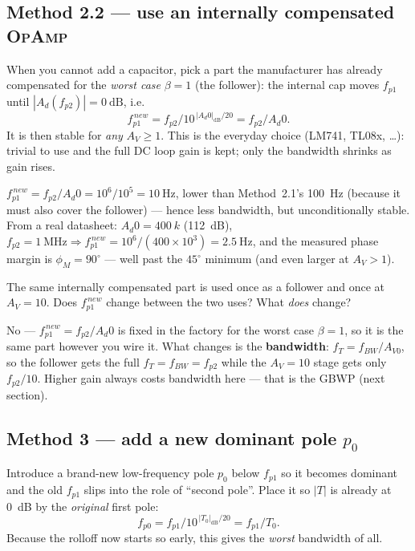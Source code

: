 \documentclass[11pt,a4paper,oneside]{book}
\newcommand{\Ad}{A_d}
\newcommand{\op}{\textsc{OpAmp}}
\begin{document}
\subsection{Method 2.2 --- use an internally compensated \op{}}
When you cannot add a capacitor, pick a part the manufacturer has already
compensated for the \emph{worst case} $\beta=1$ (the follower): the internal cap
moves $f_{p1}$ until $|\Ad(f_{p2})|=\qty{0}{\dB}$, i.e.
\[
  f_{p1}^{\,new}=f_{p2}\big/10^{\,|\Ad0|_{\mathrm{dB}}/20}=f_{p2}/\Ad0 .
\]
It is then stable for \emph{any} $A_V\ge1$. This is the everyday choice
(LM741, TL08x, \dots): trivial to use and the full DC loop gain is kept; only the
bandwidth shrinks as gain rises.

\begin{wexample}
$f_{p1}^{\,new}=f_{p2}/\Ad0=10^{6}/10^{5}=\qty{10}{\hertz}$, lower than
Method~2.1's \qty{100}{\hertz} (because it must also cover the follower) --- hence
less bandwidth, but unconditionally stable. From a real datasheet:
$\Ad0=\qty{400}{k}$ (\qty{112}{\dB}), $f_{p2}=\qty{1}{\mega\hertz}\Rightarrow
f_{p1}^{\,new}=10^{6}/(400\times10^{3})=\qty{2.5}{\hertz}$, and the measured phase
margin is $\phi_M=90^\circ$ --- well past the $45^\circ$ minimum (and even larger
at $A_V>1$).
\end{wexample}

\begin{exercise}
The same internally compensated part is used once as a follower and once at
$A_V=10$. Does $f_{p1}^{\,new}$ change between the two uses? What \emph{does}
change?
\end{exercise}
\begin{solution}
No --- $f_{p1}^{\,new}=f_{p2}/\Ad0$ is fixed in the factory for the worst case
$\beta=1$, so it is the same part however you wire it. What changes is the
\textbf{bandwidth}: $f_T=f_{BW}/A_{V0}$, so the follower gets the full
$f_T=f_{BW}=f_{p2}$ while the $A_V=10$ stage gets only $f_{p2}/10$. Higher gain
always costs bandwidth here --- that is the GBWP (next section).
\end{solution}

\subsection{Method 3 --- add a new dominant pole $p_0$}
Introduce a brand-new low-frequency pole $p_0$ below $f_{p1}$ so it becomes
dominant and the old $f_{p1}$ slips into the role of ``second pole''. Place it so
$|T|$ is already at \qty{0}{\dB} by the \emph{original} first pole:
\[
  f_{p0}=f_{p1}\big/10^{\,|T_0|_{\mathrm{dB}}/20}=f_{p1}/T_0 .
\]
Because the rolloff now starts so early, this gives the \emph{worst} bandwidth of
all.
\end{document}
